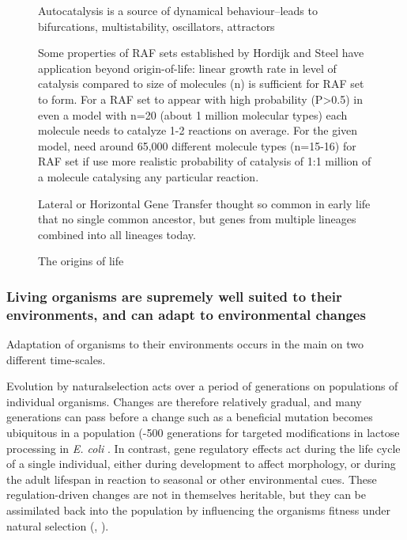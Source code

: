\begin{figure}
\begin{framed}
Autocatalysis is a source of dynamical behaviour--leads to
bifurcations, multistability, oscillators, attractors
\autocite{Plasson2010}

Some properties of RAF sets established by Hordijk and Steel have
application beyond origin-of-life: linear growth rate in level of
catalysis compared to size of molecules (n) is sufficient for RAF set to
form. For a RAF set to appear with high probability (P\textgreater{}0.5)
in even a model with n=20 (about 1 million molecular types) each
molecule needs to catalyze 1-2 reactions on average. For the given
model, need around 65,000 different molecule types (n=15-16) for RAF set
if use more realistic probability of catalysis of 1:1 million of a
molecule catalysing any particular reaction. \autocite{Hordijk2011}

Lateral or Horizontal Gene Transfer thought so common in early life that
no single common ancestor, but genes from multiple lineages combined
into all lineages today.\autocite{Ragan2009}
\end{framed}
\captionsetup{name=Box}
\caption{The origins of life}
\label{box:ool}
\end{figure}	

\subsubsection{Living organisms are supremely well suited to their environments, and can adapt to environmental changes}
\label{living-organisms-are-supremely-well-suited-to-their-environments-and-can-adapt-to-environmental-changes}

Adaptation of organisms to their environments occurs in the main on two
different time-scales.

Evolution by \gls{naturalselection} acts over a period of generations on
populations of individual organisms. Changes are therefore relatively
gradual, and many generations can pass before a change such as a
beneficial mutation becomes ubiquitous in a population (-500
generations for targeted modifications in lactose processing in
\emph{E. coli} \autocite{Dekel:2005fk}. In contrast, gene regulatory
effects act during the life cycle of a single individual, either during
development to affect morphology, or during the adult lifespan in
reaction to seasonal or other environmental cues. These
regulation-driven changes are not in themselves heritable, but they can
be assimilated back into the population by influencing the organisms
fitness under natural selection (\eg,
\autocite{Baldwin:1896ly,Dennett:2003ve,Paenke:2009xe,Paenke:2007ve}).


